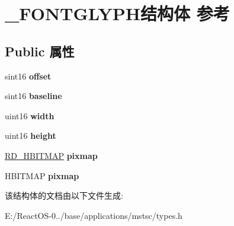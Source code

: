 \hypertarget{struct___f_o_n_t_g_l_y_p_h}{}\section{\+\_\+\+F\+O\+N\+T\+G\+L\+Y\+P\+H结构体 参考}
\label{struct___f_o_n_t_g_l_y_p_h}
\subsection*{Public 属性}
\begin{DoxyCompactItemize}
\item 
\mbox{\label{struct___f_o_n_t_g_l_y_p_h_ac3c3d2079300ef6779f7db072fe13cee}} 
sint16 {\bfseries offset}
\item 
\mbox{\label{struct___f_o_n_t_g_l_y_p_h_a0d02de26fd484845ee4318c6671d8bb2}} 
sint16 {\bfseries baseline}
\item 
\mbox{\label{struct___f_o_n_t_g_l_y_p_h_a0487e2a369d939e50c0db1054860cadd}} 
uint16 {\bfseries width}
\item 
\mbox{\label{struct___f_o_n_t_g_l_y_p_h_a12e96d0c5b1fa824fb46bcd837213eff}} 
uint16 {\bfseries height}
\item 
\mbox{\label{struct___f_o_n_t_g_l_y_p_h_af22db93cd04b6656b34245cd7f431ac5}} 
\hyperlink{interfacevoid}{R\+D\+\_\+\+H\+B\+I\+T\+M\+AP} {\bfseries pixmap}
\item 
\mbox{\label{struct___f_o_n_t_g_l_y_p_h_a91ac967bde83fbcb82da044ba82d6245}} 
H\+B\+I\+T\+M\+AP {\bfseries pixmap}
\end{DoxyCompactItemize}


该结构体的文档由以下文件生成\+:\begin{DoxyCompactItemize}
\item 
E\+:/\+React\+O\+S-\/0../base/applications/mstsc/types.\+h\end{DoxyCompactItemize}

